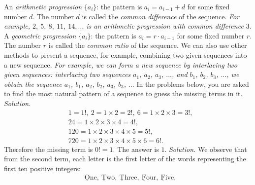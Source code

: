 \begin{multicols}{2}
	An \textit{arithmetic progression} $\{a_i\}$: the pattern is  $a_i = a_{i-1}+ d$ for some fixed number
	$d$. The number $d$ is called the \textit{common difference} of the sequence.
	\vskip 0.05cm
	\textit{For example, $2,\ 5,\ 8,\ 11,\ 14, \ldots$ is an arithmetic progression with common difference $3$.}
	\vskip 0.05cm
	A \textit{geometric progression} $\{a_i\}$: the pattern is  $a_i = r\cdot a_{i-1}$ for some fixed number $r$.
	The number $r$ is called the \textit{common ratio} of the sequence. 
	\vskip 0.05cm
	We can also use other methods to present a sequence, for example, combining two given sequences into a new sequence.
	\vskip 0.05cm
	\textit{For example, we can form a new sequence by interlacing two given sequences: interlacing two sequences $a_1$, $a_2$, $a_3$, $\ldots$,
		and $b_1$, $b_2$, $b_3$, $\ldots$, we obtain the sequence $a_1$, $b_1$, $a_2$, $b_2$, $a_3$, $b_3$, $\ldots$}
	\vskip 0.05cm
	In the problems below, you are asked to find the most natural pattern of a sequence to guess the missing terms in it.
	\vskip 0.05cm
	\vskip 0.05cm
	\textit{Solution.} 
		\begin{align*}
			&1 = 1!,\ 2 = 1 \times 2 = 2!,\ 6 = 1 \times 2 \times 3 = 3!,\\
			&24 = 1 \times 2 \times 3 \times 4 = 4!,\\
			&120 = 1 \times 2 \times 3 \times 4 \times 5 = 5!,\\
			&720 = 1 \times 2 \times 3 \times 4 \times 5 \times 6 = 6!. 
		\end{align*}
		Therefore the missing term is $0!=1$. The answer is $1$.
	\vskip 0.05cm
	\vskip 0.05cm
	\textit{Solution.} We observe that from the second term, each letter is the first
	letter of the words representing the first ten positive integers:
	\begin{align*}
		&\underline{\text{O}}\text{ne},\ \underline{\text{T}}\text{wo},\ \underline{\text{T}}\text{hree},\ \underline{\text{F}}\text{our},\
		\underline{\text{F}}\text{ive},\\ 

\end{align*}
\end{multicols}
